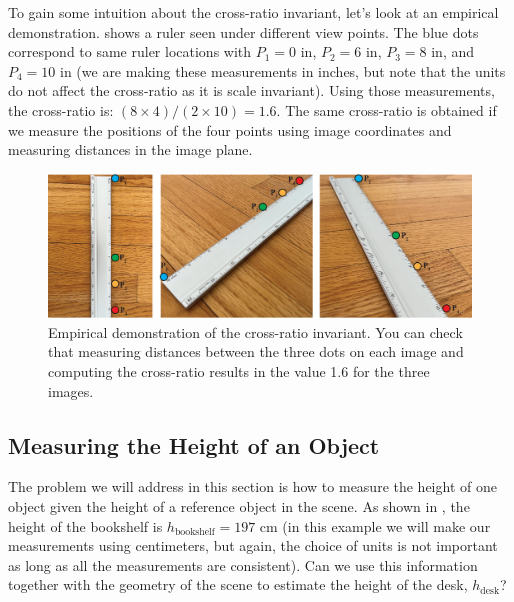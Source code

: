To gain some intuition about the cross-ratio invariant, let's look at an empirical demonstration. \Fig{\ref{fig:cross_ratio_rulers}} shows a ruler seen under different view points. The blue dots correspond to same ruler locations with $P_1=0$ in, $P_2=6$ in, $P_3=8$ in, and $P_4=10$ in (we are making these measurements in inches, but note that the units do not affect the cross-ratio as it is scale invariant). Using those measurements, the cross-ratio is: $(8 \times 4)/(2 \times 10) = 1.6$. The same cross-ratio is obtained if we measure the positions of the four points using image coordinates and measuring distances in the image plane.

\begin{figure}
\centerline{
\includegraphics[width=1\linewidth]{figures/single_view_3d/cross-ratio.png}
} 
\caption{Empirical demonstration of the cross-ratio invariant. You can check that measuring distances between the three dots on each image and computing the cross-ratio results in the value 1.6 for the three images.}
\label{fig:cross_ratio_rulers}
\end{figure}

\subsection{Measuring the Height of an Object}

The problem we will address in this section is how to measure the height of one object given the height of a reference object in the scene. %
As shown in \fig{\ref{fig:office_measuring_desk_setup}}, the height of the bookshelf is $h_{\text{bookshelf}}=197$ cm (in this example we will make our measurements using centimeters, but again, the choice of units is not important as long as all the measurements are consistent). Can we use this information together with the geometry of the scene to estimate the height of the desk, $h_{\text{desk}}$?


